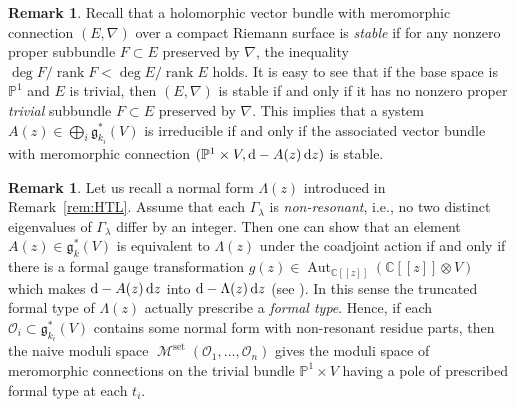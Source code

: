 \documentclass[pdftex]{sigma}
\numberwithin{equation}{section}
\theoremstyle{definition}
\newtheorem{Remark}[Theorem]{Remark}
\newcommand{\remref}[1]{Remark~\ref{#1}}
\newcommand{\C}{\mathbb{C}} %
\newcommand{\bbP}{\mathbb{P}} %
\newcommand{\g}{\mathfrak{g}} %
\newcommand{\End}{\operatorname{End}}
\newcommand{\Aut}{\operatorname{Aut}}
\newcommand{\rank}{\operatorname{rank}}
\newcommand{\unit}{\mathrm{Id}}
\newcommand{\Mset}{\operatorname{\mathcal{M}}^\mathrm{set}}
\newcommand{\bO}{\mathcal{O}}
\newcommand{\rd}{\mathop{\mathrm{d}\!}\mathstrut}
\begin{document}
\begin{Remark}\label{rem:stable-bundle}
Recall that a holomorphic vector bundle with meromorphic connection
$(E,\nabla)$ over a compact Riemann surface
is {\em stable} if for any nonzero proper subbundle $F \subset E$
preserved by $\nabla$,
the inequality $\deg F/\rank F < \deg E/\rank E$ holds.
It is easy to see that if the base space is $\bbP^1$ and
$E$ is trivial, then $(E,\nabla)$ is stable if and only if
it has no nonzero proper {\em trivial} subbundle $F \subset E$
preserved by $\nabla$.
This implies that a system $A(z) \in \bigoplus_i \g^*_{k_i}(V)$
is irreducible if and only if
the associated vector bundle with meromorphic connection
$(\bbP^1 \times V, \rd - A(z)\rd z)$ is stable.
\end{Remark}

\begin{Remark}\label{rem:moduli}
Let us recall a normal form $\Lambda(z)$ introduced in \remref{rem:HTL}.
Assume that each $\Gamma_\lambda$ is {\em non-resonant},
i.e., no two distinct eigenvalues of $\Gamma_\lambda$
dif\/fer by an integer.
Then one can show that an element $A(z) \in \g^*_k(V)$
is equivalent to $\Lambda(z)$ under the coadjoint action
if and only if there is a formal gauge transformation
$g(z) \in \Aut_{\C[[z]]}(\C[[z]] \otimes V)$
which makes $\rd -A(z)\rd z$ into $\rd - \Lambda(z)\rd z$
(see \cite[Remark~18]{0911.3863}).
In this sense the truncated formal type of $\Lambda(z)$
actually prescribe a {\em formal type}.
Hence, if each $\bO_i \subset \g^*_{k_i}(V)$
contains some normal form with non-resonant residue parts,
then the naive moduli space $\Mset(\bO_1,\dots ,\bO_n)$
gives the moduli space of meromorphic connections
on the trivial bundle $\bbP^1 \times V$
having a pole of prescribed formal type at each $t_i$.
\end{Remark}
\end{document}
